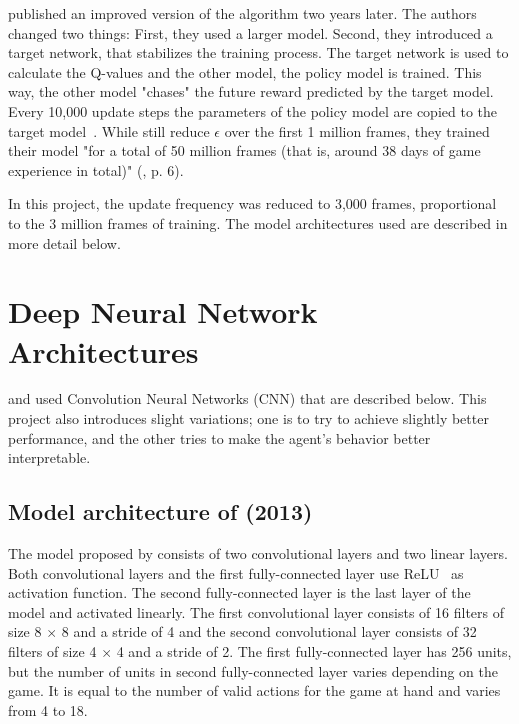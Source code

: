 \textcite{mnih_human-level_2015} published an improved version of the algorithm two years later. The authors changed two things: First, they used a larger model. Second, they introduced a target network, that stabilizes the training process. The target network is used to calculate the Q-values and the other model, the policy model is trained. This way, the other model "chases" the future reward predicted by the target model. Every 10,000 update steps the parameters of the policy model are copied to the target model~\parencite{mnih_human-level_2015}. While \textcite{mnih_human-level_2015} still reduce $\epsilon$ over the first 1 million frames, they trained their model "for a total of 50 million frames (that is, around 38 days of game experience in total)" (\parencite{mnih_human-level_2015}, p. 6).

In this project, the update frequency was reduced to 3,000 frames, proportional to the 3 million frames of training. The model architectures used are described in more detail below.

\section{Deep Neural Network Architectures}

\textcite{mnih_playing_2013} and \textcite{mnih_human-level_2015} used Convolution Neural Networks (CNN) that are  described below. This project also introduces slight variations; one is to try to achieve slightly better performance, and the other tries to make the agent's behavior better interpretable.

\subsection{Model architecture of \textcite{mnih_playing_2013} (2013)}

The model proposed by \textcite{mnih_playing_2013} consists of two convolutional layers and two linear layers. Both convolutional layers and the first fully-connected layer use ReLU~\parencite{hahnloser_digital_2000} as activation function. The second fully-connected layer is the last layer of the model and activated linearly. The first convolutional layer consists of 16 filters of size 8 $\times$ 8 and a stride of 4 and the second convolutional layer consists of 32 filters of size 4 $\times$ 4 and a stride of 2. The first fully-connected layer has 256 units, but the number of units in second fully-connected layer varies depending on the game. It is equal to the number of valid actions for the game at hand and varies from 4 to 18.

